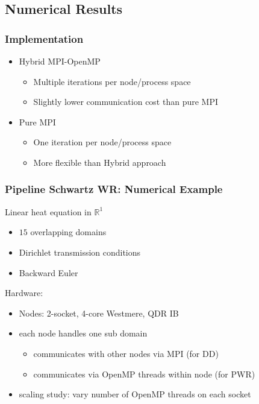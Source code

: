 \documentclass{beamer}
\begin{document}
\subsection{Numerical Results}

\begin{frame}
  \frametitle{Implementation}

  \begin{itemize}
  \item Hybrid MPI-OpenMP
    \begin{itemize}
    \item Multiple iterations per node/process space
    \item Slightly lower communication cost than pure MPI
    \end{itemize}
  \item Pure MPI
    \begin{itemize}
    \item One iteration per node/process space
    \item More flexible than Hybrid approach
    \end{itemize}
  \end{itemize}

\end{frame}

\begin{frame}
  \frametitle{Pipeline Schwartz WR: Numerical Example}

  Linear heat equation in $\mathbb{R}^1$
  \begin{itemize}
  \item $15$ overlapping domains
  \item Dirichlet transmission conditions
  \item Backward Euler
  \end{itemize}

  \vspace*{0.1in}
  Hardware:
  \begin{itemize}
  \item Nodes: 2-socket, 4-core Westmere, QDR IB
  \item each node handles one sub domain 
    \begin{itemize}
      \item communicates with other nodes via MPI (for DD)
      \item communicates via OpenMP threads within node (for PWR)
    \end{itemize}
  \item scaling study: vary number of OpenMP threads on each socket 
  \end{itemize}
\end{frame}
\end{document}
